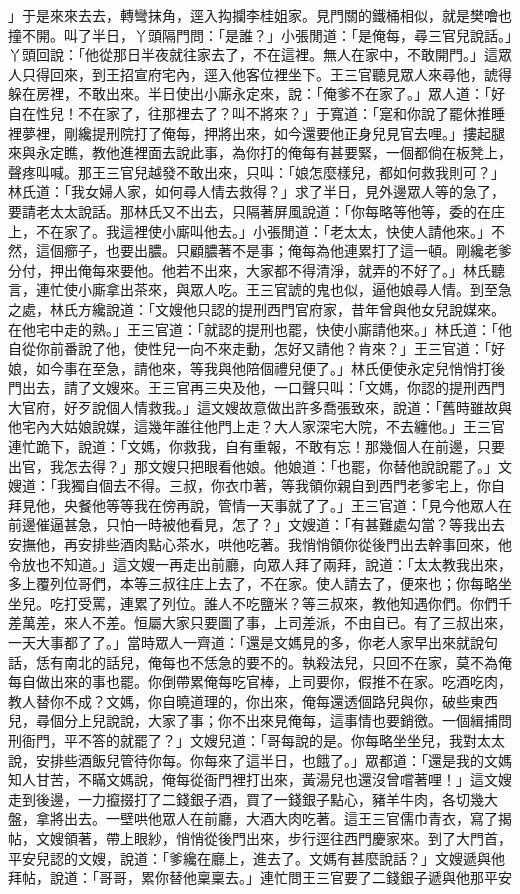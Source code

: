 」于是來來去去，轉彎抹角，逕入抅攔李桂姐家。見門關的鐵桶相似，就是樊噲也撞不開。叫了半日，丫頭隔門問：「是誰？」小張閒道：「是俺每，尋三官兒說話。」丫頭回說：「他從那日半夜就往家去了，不在這裡。無人在家中，不敢開門。」這眾人只得回來，到王招宣府宅內，逕入他客位裡坐下。王三官聽見眾人來尋他，諕得躲在房裡，不敢出來。半日使出小廝永定來，說：「俺爹不在家了。」眾人道：「好自在性兒！不在家了，往那裡去了？叫不將來？」于寬道：「寔和你說了罷休推睡裡夢裡，剛纔提刑院打了俺每，押將出來，如今還要他正身兒見官去哩。」摟起腿來與永定瞧，教他進裡面去說此事，為你打的俺每有甚要緊，一個都倘在板凳上，聲疼叫喊。那王三官兒越發不敢出來，只叫：「娘怎麼樣兒，都如何救我則可？」林氏道：「我女婦人家，如何尋人情去救得？」求了半日，見外邊眾人等的急了，要請老太太說話。那林氏又不出去，只隔著屏風說道：「你每略等他等，委的在庄上，不在家了。我這裡使小廝叫他去。」小張閒道：「老太太，快使人請他來。」不然，這個癤子，也要出膿。只顧膿著不是事；俺每為他連累打了這一頓。剛纔老爹分付，押出俺每來要他。他若不出來，大家都不得清淨，就弄的不好了。」林氏聽言，連忙使小廝拿出茶來，與眾人吃。王三官諕的鬼也似，逼他娘尋人情。到至急之處，林氏方纔說道：「文嫂他只認的提刑西門官府家，昔年曾與他女兒說媒來。在他宅中走的熟。」王三官道：「就認的提刑也罷，快使小廝請他來。」林氏道：「他自從你前番說了他，使性兒一向不來走動，怎好又請他？肯來？」王三官道：「好娘，如今事在至急，請他來，等我與他陪個禮兒便了。」林氏便使永定兒悄悄打後門出去，請了文嫂來。王三官再三央及他，一口聲只叫：「文媽，你認的提刑西門大官府，好歹說個人情救我。」這文嫂故意做出許多喬張致來，說道：「舊時雖故與他宅內大姑娘說媒，這幾年誰往他門上走？大人家深宅大院，不去纏他。」王三官連忙跪下，說道：「文媽，你救我，自有重報，不敢有忘！那幾個人在前邊，只要出官，我怎去得？」那文嫂只把眼看他娘。他娘道：「也罷，你替他說說罷了。」文嫂道：「我獨自個去不得。三叔，你衣巾著，等我領你親自到西門老爹宅上，你自拜見他，央餐他等等我在傍再說，管情一天事就了了。」王三官道：「見今他眾人在前邊催逼甚急，只怕一時被他看見，怎了？」文嫂道：「有甚難處勾當？等我出去安撫他，再安排些酒肉點心茶水，哄他吃著。我悄悄領你從後門出去幹事回來，他令放也不知道。」這文嫂一再走出前廳，向眾人拜了兩拜，說道：「太太教我出來，多上覆列位哥們，本等三叔往庄上去了，不在家。使人請去了，便來也；你每略坐坐兒。吃打受罵，連累了列位。誰人不吃鹽米？等三叔來，教他知遇你們。你們千差萬差，來人不差。恒屬大家只要圖了事，上司差派，不由自已。有了三叔出來，一天大事都了了。」當時眾人一齊道：「還是文媽見的多，你老人家早出來就說句話，恁有南北的話兒，俺每也不恁急的要不的。執殺法兒，只回不在家，莫不為俺每自做出來的事也罷。你倒帶累俺每吃官棒，上司要你，假推不在家。吃酒吃肉，教人替你不成？文媽，你自曉道理的，你出來，俺每還透個路兒與你，破些東西兒，尋個分上兒說說，大家了事；你不出來見俺每，這事情也要銷徼。一個緝捕問刑衙門，平不答的就罷了？」文嫂兒道：「哥每說的是。你每略坐坐兒，我對太太說，安排些酒飯兒管待你每。你每來了這半日，也餓了。」眾都道：「還是我的文媽知人甘苦，不瞞文媽說，俺每從衙門裡打出來，黃湯兒也還沒曾嚐著哩！」這文嫂走到後邊，一力攛掇打了二錢銀子酒，買了一錢銀子點心，豬羊牛肉，各切幾大盤，拿將出去。一壁哄他眾人在前廳，大酒大肉吃著。這王三官儒巾青衣，寫了揭帖，文嫂領著，帶上眼紗，悄悄從後門出來，步行逕往西門慶家來。到了大門首，平安兒認的文嫂，說道：「爹纔在廳上，進去了。文媽有甚麼說話？」文嫂遞與他拜帖，說道：「哥哥，累你替他稟稟去。」連忙問王三官要了二錢銀子遞與他那平安